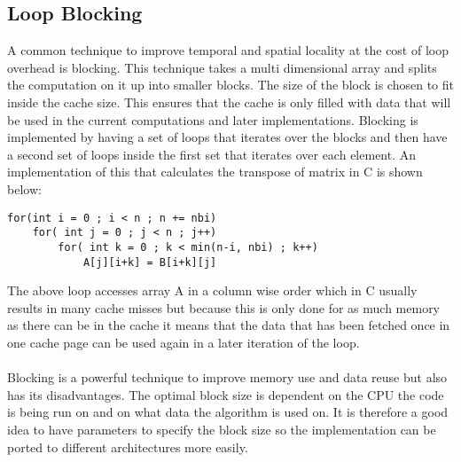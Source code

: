 \subsection{Loop Blocking}
A common technique to improve temporal and spatial locality at the cost of loop overhead is blocking. This technique takes a multi dimensional array and splits the computation on it up into smaller blocks. The size of the block is chosen to fit inside the cache size. This ensures that the cache is only filled with data that will be used in the current computations and later implementations. Blocking is implemented by having a set of loops that iterates over the blocks and then have a second set of loops inside the first set that iterates over each element. An implementation of this that calculates the transpose of matrix in C is shown below: 
\begin{lstlisting}
for(int i = 0 ; i < n ; n += nbi)
	for( int j = 0 ; j < n ; j++)
		for( int k = 0 ; k < min(n-i, nbi) ; k++)
			A[j][i+k] = B[i+k][j]
\end{lstlisting}
The above loop accesses array A in a column wise order which in C usually results in many cache misses but because this is only done for as much memory as there can be in the cache it means that the data that has been fetched once in one cache page can be used again in a later iteration of the loop.
\\\\
Blocking is a powerful technique to improve memory use and data reuse but also has its disadvantages. The optimal block size is dependent on the CPU the code is being run on and on what data the algorithm is used on. It is therefore a good idea to have parameters to specify the block size so the implementation can be ported to different architectures more easily.